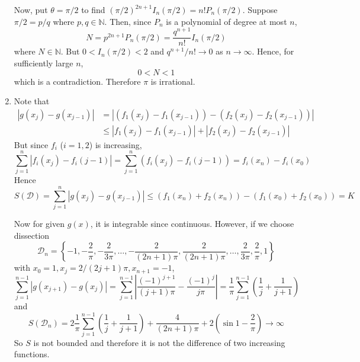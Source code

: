 \documentclass[10pt, a4paper, twoside]{report}
\begin{document}
\begin{enumerate}[{1.}]
    Now, put \(\theta=\pi/2\) to find \(\left(\pi/2\right)^{2n+1}I_n(\pi/2)=n!P_n(\pi/2)\). Suppose \(\pi/2=p/q\) where \(p,q\in\mathbb{N}\). Then, since \(P_n\) is a polynomial of degree at most \(n\), 
    \[N=p^{2n+1}P_n(\pi/2)=\frac{q^{n+1}}{n!}I_n(\pi/2)\]
    where \(N\in\mathbb{N}\). But \(0<I_n(\pi/2)<2\) and \(q^{n+1}/n!\to 0\) as \(n\to\infty\). Hence, for sufficiently large \(n\),
    \[0<N<1\] which is a contradiction. Therefore \(\pi\) is irrational.
    \item Note that 
    \begin{align*}
        |g(x_j)-g(x_{j-1})|&=|(f_1(x_j)-f_1(x_{j-1}))-(f_2(x_j)-f_2(x_{j-1}))| \\
        &\leq |f_1(x_j)-f_1(x_{j-1})|+|f_2(x_j)-f_2(x_{j-1})|
    \end{align*}
    But since \(f_i\) (\(i=1,2\)) is increasing,
    \[\sum_{j=1}^n|f_i(x_j)-f_i(j-1)|=\sum_{j=1}^n(f_i(x_j)-f_i(j-1))=f_i(x_n)-f_i(x_0)\]
    Hence 
    \[S(\mathcal{D})=\sum_{j=1}^n|g(x_j)-g(x_{j-1})|\leq (f_1(x_n)+f_2(x_n))-(f_1(x_0)+f_2(x_0))=K\]

    Now for given \(g(x)\), it is integrable since continuous. However, if we choose dissection 
    \[\mathcal{D}_n=\left\{-1,-\frac 2\pi,-\frac 2{3\pi},\ldots,-\frac{2}{(2n+1)\pi},\frac 2{(2n+1)\pi},\ldots,\frac 2{3\pi},\frac 2\pi,1\right\}\]
    with \(x_0=1,x_j=2/(2j+1)\pi,x_{n+1}=-1\),
    \[\sum_{j=1}^{n-1}|g(x_{j+1})-g(x_{j})|=\sum_{j=1}^{n-1}\left|\frac{(-1)^{j+1}}{(j+1)\pi}-\frac{(-1)^j}{j\pi}\right|=\frac 1\pi\sum_{j=1}^{n-1}\left(\frac 1j+\frac 1{j+1}\right)\]
    and 
    \[S(\mathcal{D}_n)=2\frac 1\pi\sum_{j=1}^{n-1}\left(\frac 1j+\frac 1{j+1}\right)+\frac 4{(2n+1)\pi}+2\left(\sin 1-\frac 2\pi\right)\to\infty\]
    So \(S\) is not bounded and therefore it is not the difference of two increasing functions.
    \end{enumerate}
\end{document}
